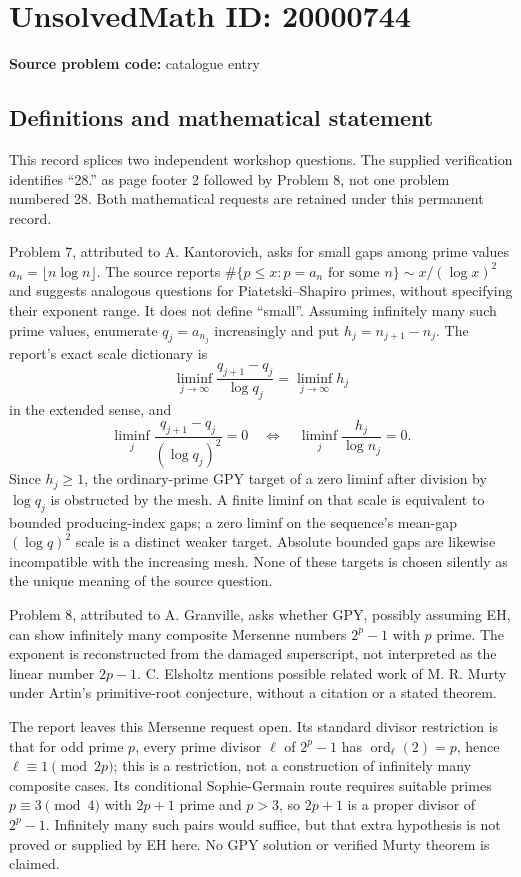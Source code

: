 \documentclass[11pt]{article}
\begin{document}
\section*{UnsolvedMath ID: 20000744}
\textbf{Source problem code:} catalogue entry
\subsection{Definitions and mathematical statement}
This record splices two independent workshop questions. The supplied verification identifies ``28.'' as page footer 2 followed by Problem 8, not one problem numbered 28. Both mathematical requests are retained under this permanent record.

Problem 7, attributed to A. Kantorovich, asks for small gaps among prime values \(a_n=\lfloor n\log n\rfloor\). The source reports \(\#\{p\le x:p=a_n\text{ for some }n\}\sim x/(\log x)^2\) and suggests analogous questions for Piatetski--Shapiro primes, without specifying their exponent range. It does not define ``small''. Assuming infinitely many such prime values, enumerate \(q_j=a_{n_j}\) increasingly and put \(h_j=n_{j+1}-n_j\). The report's exact scale dictionary is
\[
 \liminf_{j\to\infty}\frac{q_{j+1}-q_j}{\log q_j}
 =\liminf_{j\to\infty}h_j
\]
in the extended sense, and
\[
 \liminf_j\frac{q_{j+1}-q_j}{(\log q_j)^2}=0
 \quad\Longleftrightarrow\quad
 \liminf_j\frac{h_j}{\log n_j}=0.
\]
Since \(h_j\ge1\), the ordinary-prime GPY target of a zero liminf after division by \(\log q_j\) is obstructed by the mesh. A finite liminf on that scale is equivalent to bounded producing-index gaps; a zero liminf on the sequence's mean-gap \((\log q)^2\) scale is a distinct weaker target. Absolute bounded gaps are likewise incompatible with the increasing mesh. None of these targets is chosen silently as the unique meaning of the source question.

Problem 8, attributed to A. Granville, asks whether GPY, possibly assuming EH, can show infinitely many composite Mersenne numbers \(2^p-1\) with \(p\) prime. The exponent is reconstructed from the damaged superscript, not interpreted as the linear number \(2p-1\). C. Elsholtz mentions possible related work of M. R. Murty under Artin's primitive-root conjecture, without a citation or a stated theorem.

The report leaves this Mersenne request open. Its standard divisor restriction is that for odd prime \(p\), every prime divisor \(\ell\) of \(2^p-1\) has \(\operatorname{ord}_\ell(2)=p\), hence \(\ell\equiv1\pmod{2p}\); this is a restriction, not a construction of infinitely many composite cases. Its conditional Sophie-Germain route requires suitable primes \(p\equiv3\pmod4\) with \(2p+1\) prime and \(p>3\), so \(2p+1\) is a proper divisor of \(2^p-1\). Infinitely many such pairs would suffice, but that extra hypothesis is not proved or supplied by EH here. No GPY solution or verified Murty theorem is claimed.
\end{document}
